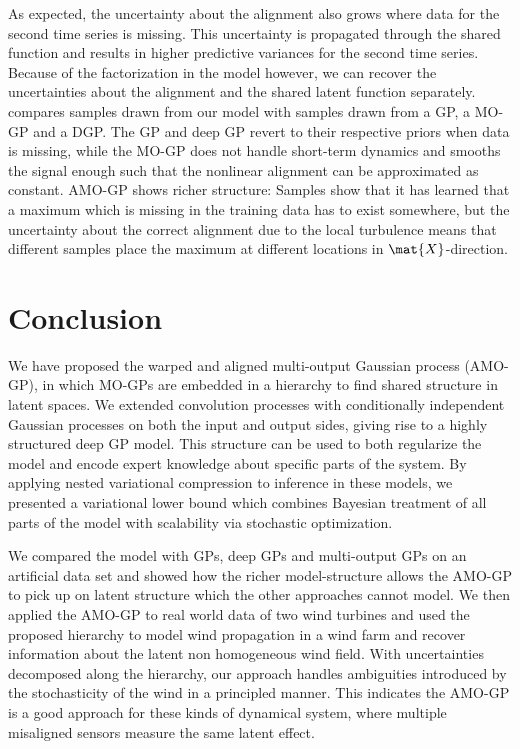 \documentclass{article}
\begin{document}
As expected, the uncertainty about the alignment also grows where data for the second time series is missing.
This uncertainty is propagated through the shared function and results in higher predictive variances for the second time series.
Because of the factorization in the model however, we can recover the uncertainties about the alignment and the shared latent function separately.
 compares samples drawn from our model with samples drawn from a GP, a MO-GP and a DGP.
The GP and deep GP revert to their respective priors when data is missing, while the MO-GP does not handle short-term dynamics and smooths the signal enough such that the nonlinear alignment can be approximated as constant.
AMO-GP shows richer structure:
Samples show that it has learned that a maximum which is missing in the training data has to exist somewhere, but the uncertainty about the correct alignment due to the local turbulence means that different samples place the maximum at different locations in $\mat{X}$-direction.


\section{Conclusion}
\label{sec:conclusion}
We have proposed the warped and aligned multi-output Gaussian process (AMO-GP), in which MO-GPs are embedded in a hierarchy to find shared structure in latent spaces.
We extended convolution processes \parencite{boyle_dependent_2004} with conditionally independent Gaussian processes on both the input and output sides, giving rise to a highly structured deep GP model.
This structure can be used to both regularize the model and encode expert knowledge about specific parts of the system.
By applying nested variational compression \parencite{hensman_nested_2014} to inference in these models, we presented a variational lower bound which combines Bayesian treatment of all parts of the model with scalability via stochastic optimization.

We compared the model with GPs, deep GPs and multi-output GPs on an artificial data set and showed how the richer model-structure allows the AMO-GP to pick up on latent structure which the other approaches cannot model.
We then applied the AMO-GP to real world data of two wind turbines and used the proposed hierarchy to model wind propagation in a wind farm and recover information about the latent non homogeneous wind field.
With uncertainties decomposed along the hierarchy, our approach handles ambiguities introduced by the stochasticity of the wind in a principled manner.
This indicates the AMO-GP is a good approach for these kinds of dynamical system, where multiple misaligned sensors measure the same latent effect.
\end{document}
